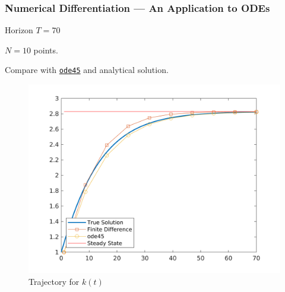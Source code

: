 \documentclass[11pt,xcolor={svgnames},aspectratio=169,usepdftitle=false]{beamer}
\let\toneitemize\itemize
\let\ttwoitemize\enditemize
\renewenvironment{itemize}{\toneitemize\addtolength{\itemsep}{0.7\baselineskip}}{\ttwoitemize}
\begin{document}
\begin{frame}
  \frametitle{Numerical Differentiation --- An Application to ODEs}
  \begin{minipage}{0.3\textwidth}
  \begin{itemize}
    \item Horizon $T = 70$
    \item $N = 10$ points.
    \item Compare with \href{https://www.mathworks.com/help/matlab/ref/ode45.html}{\texttt{ode45}} and analytical solution.
  \end{itemize}
  \end{minipage}
\begin{minipage}{0.65\textwidth}
  \begin{figure}
    \centering
    \includegraphics[width = \textwidth]{../figures/solow_solution.png}
    \caption{Trajectory for $k(t)$}
    \label{fig:solow_finitedifferences}
  \end{figure}
\end{minipage}
\end{frame}
\end{document}

